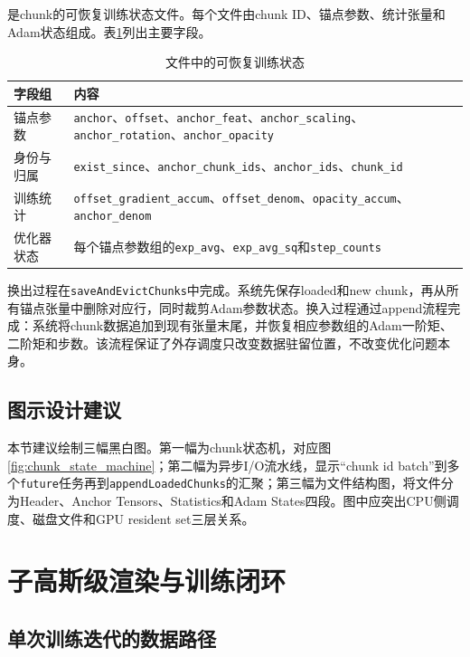 \schun 是chunk的可恢复训练状态文件。每个文件由chunk ID、锚点参数、统计张量和Adam状态组成。表\ref{tab:schun_format}列出主要字段。

\begin{table}[htbp]
\centering
\caption{\schun 文件中的可恢复训练状态}
\label{tab:schun_format}
\begin{tabular}{p{3.3cm}p{8.8cm}}
\toprule
\textbf{字段组} & \textbf{内容} \\
\midrule
锚点参数 & \texttt{anchor}、\texttt{offset}、\texttt{anchor\_feat}、\texttt{anchor\_scaling}、\texttt{anchor\_rotation}、\texttt{anchor\_opacity} \\
身份与归属 & \texttt{exist\_since}、\texttt{anchor\_chunk\_ids}、\texttt{anchor\_ids}、\texttt{chunk\_id} \\
训练统计 & \texttt{offset\_gradient\_accum}、\texttt{offset\_denom}、\texttt{opacity\_accum}、\texttt{anchor\_denom} \\
优化器状态 & 每个锚点参数组的\texttt{exp\_avg}、\texttt{exp\_avg\_sq}和\texttt{step\_counts} \\
\bottomrule
\end{tabular}
\end{table}

换出过程在\texttt{saveAndEvictChunks}中完成。系统先保存loaded和new chunk，再从所有锚点张量中删除对应行，同时裁剪Adam参数状态。换入过程通过append流程完成：系统将chunk数据追加到现有张量末尾，并恢复相应参数组的Adam一阶矩、二阶矩和步数。该流程保证了外存调度只改变数据驻留位置，不改变优化问题本身。

\subsection{图示设计建议}

本节建议绘制三幅黑白图。第一幅为chunk状态机，对应图\ref{fig:chunk_state_machine}；第二幅为异步I/O流水线，显示``chunk id batch''到多个\texttt{future}任务再到\texttt{appendLoadedChunks}的汇聚；第三幅为\schun 文件结构图，将文件分为Header、Anchor Tensors、Statistics和Adam States四段。图中应突出CPU侧调度、磁盘文件和GPU resident set三层关系。

\section{子高斯级渲染与训练闭环}

\subsection{单次训练迭代的数据路径}

